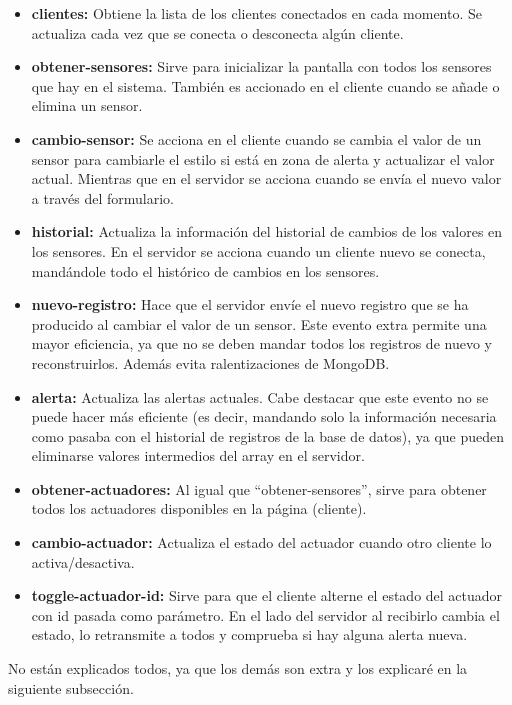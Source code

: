 \documentclass{article}
\begin{document}
\begin{itemize}
    \item \textbf{clientes: }Obtiene la lista de los clientes conectados en cada momento. Se actualiza cada vez que se conecta o desconecta algún cliente.
    \item \textbf{obtener-sensores: }Sirve para inicializar la pantalla con todos los sensores que hay en el sistema. También es accionado en el cliente cuando se añade o elimina un sensor.
    \item \textbf{cambio-sensor: }Se acciona en el cliente cuando se cambia el valor de un sensor para cambiarle el estilo si está en zona de alerta y actualizar el valor actual. Mientras que en el servidor se acciona cuando se envía el nuevo valor a través del formulario.
    \item \textbf{historial: }Actualiza la información del historial de cambios de los valores en los sensores. En el servidor se acciona cuando un cliente nuevo se conecta, mandándole todo el histórico de cambios en los sensores.
    \item \textbf{nuevo-registro: }Hace que el servidor envíe el nuevo registro que se ha producido al cambiar el valor de un sensor. Este evento extra permite una mayor eficiencia, ya que no se deben mandar todos los registros de nuevo y reconstruirlos. Además evita ralentizaciones de MongoDB.
    \item \textbf{alerta: }Actualiza las alertas actuales. Cabe destacar que este evento no se puede hacer más eficiente (es decir, mandando solo la información necesaria como pasaba con el historial de registros de la base de datos), ya que pueden eliminarse valores intermedios del array en el servidor.
    \item \textbf{obtener-actuadores: }Al igual que ``obtener-sensores'', sirve para obtener todos los actuadores disponibles en la página (cliente).
    \item \textbf{cambio-actuador: }Actualiza el estado del actuador cuando otro cliente lo activa/desactiva.
    \item \textbf{toggle-actuador-id: }Sirve para que el cliente alterne el estado del actuador con id pasada como parámetro. En el lado del servidor al recibirlo cambia el estado, lo retransmite a todos y comprueba si hay alguna alerta nueva.
\end{itemize}

No están explicados todos, ya que los demás son extra y los explicaré en la siguiente subsección.
\end{document}
